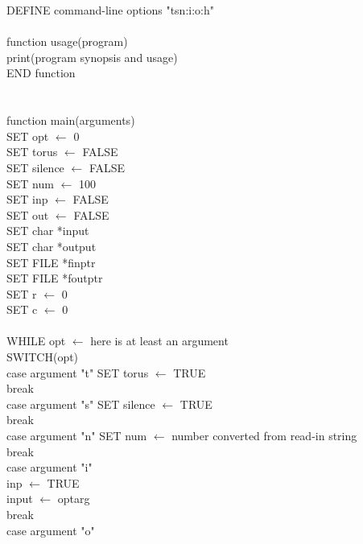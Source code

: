 \documentclass[12pt]{article}
\begin{document}
DEFINE command-line options "tsn:i:o:h" \\
\\
function usage(program) \\
\indent print(program synopsis and usage) \\
END function \\
\\
\\
function main(arguments) \\
\indent SET opt $\leftarrow$ 0 \\
\indent SET torus $\leftarrow$ FALSE \\
\indent SET silence $\leftarrow$ FALSE \\
\indent SET num $\leftarrow$ 100 \\
\indent SET inp $\leftarrow$ FALSE \\
\indent SET out $\leftarrow$ FALSE \\
\indent SET char *input \\
\indent SET char *output \\
\indent SET FILE *finptr \\
\indent SET FILE *foutptr \\
\indent SET r $\leftarrow$ 0 \\
\indent SET c $\leftarrow$ 0 \\
\\
\indent WHILE opt $\leftarrow$ here is at least an argument \\
\indent \indent SWITCH(opt) \\
\indent \indent \indent case argument "t" SET torus $\leftarrow$ TRUE \\
\indent \indent \indent \indent break \\
\indent \indent \indent case argument "s" SET silence $\leftarrow$ TRUE \\
\indent \indent \indent \indent break \\
\indent \indent \indent case argument "n" SET num $\leftarrow$ number converted from read-in string \\
\indent \indent \indent \indent break \\
\indent \indent \indent case argument "i" \\
\indent \indent \indent \indent inp $\leftarrow$ TRUE \\
\indent \indent \indent \indent input $\leftarrow$ optarg \\
\indent \indent \indent \indent break \\
\indent \indent \indent case argument "o" \\
\end{document}
